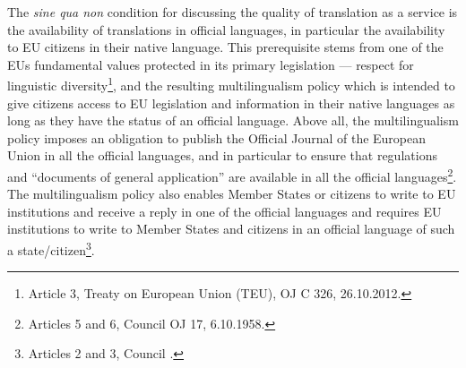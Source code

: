\documentclass[output=paper]{langsci/langscibook}
\begin{document}
The \textit{sine qua non} condition for discussing the quality of translation as a service is the availability of translations in official languages, in particular the availability to EU citizens in their native language. This prerequisite stems from one of the EUs fundamental values protected in its primary legislation — respect for linguistic diversity\footnote{Article 3, Treaty on European Union (TEU), OJ C 326, 26.10.2012.}, and the resulting multilingualism policy which is intended to give citizens access to EU legislation and information in their native languages as long as they have the status of an official language. Above all, the multilingualism policy imposes an obligation to publish the Official Journal of the European Union in all the official languages, and in particular to ensure that regulations and “documents of general application” are available in all the official languages\footnote{Articles 5 and 6, Council OJ 17, 6.10.1958.}. The multilingualism policy also enables Member States or citizens to write to EU institutions and receive a reply in one of the official languages and requires EU institutions to write to Member States and citizens in an official language of such a state/citizen\footnote{Articles 2 and 3, Council .}.
\end{document}
